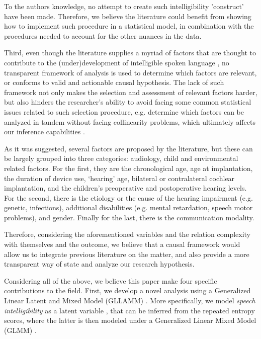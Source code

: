 To the authors knowledge, no attempt to create such intelligibility 'construct' have been made. Therefore, we believe the literature could benefit from showing how to implement such procedure in a statistical model, in combination with the procedures needed to account for the other nuances in the data.

Third, even though the literature supplies a myriad of factors that are thought to contribute to the (under)development of intelligible spoken language \cite{Boons_et_al_2012, Gillis_2018, Fagan_et_al_2020, Niparko_et_al_2010}, no transparent framework of analysis is used to determine which factors are relevant, or conforms to valid and actionable causal hypothesis. The lack of such framework not only makes the selection and assessment of relevant factors harder, but also hinders the researcher's ability to avoid facing some common statistical issues related to such selection procedure, e.g. determine which factors can be analyzed in tandem without facing collinearity problems, which ultimately affects our inference capabilities \cite{Farrar_et_al_1967}.

As it was suggested, several factors are proposed by the literature, but these can be largely grouped into three categories: audiology, child and environmental related factors. For the first, they are the chronological age, age at implantation, the duration of device use, `hearing' age, bilateral or contralateral cochlear implantation, and the children's preoperative and postoperative hearing levels. For the second, there is the etiology or the cause of the hearing impairment (e.g. genetic, infections), additional disabilities (e.g. mental retardation, speech motor problems), and gender. Finally for the last, there is the communication modality. 

Therefore, considering the aforementioned variables and the relation complexity with themselves and the outcome, we believe that a causal framework would allow us to integrate previous literature on the matter, and also provide a more transparent way of state and analyze our research hypothesis.

Considering all of the above, we believe this paper make four specific contributions to the field. First, we develop a novel analysis using a Generalized Linear Latent and Mixed Model (GLLAMM) \cite{Rabe_et_al_2004a, Rabe_et_al_2004b, Rabe_et_al_2004c, Rabe_et_al_2012, Skrondal_et_al_2004a}. More specifically, we model \textit{speech intelligibility} as a latent variable \cite{Everitt_1984}, that can be inferred from the repeated entropy scores, where the latter is then modeled under a Generalized Linear Mixed Model (GLMM) \cite{Breslow_et_al_1993, Nelder_et_al_1996, Nelder_et_al_1983}. 

